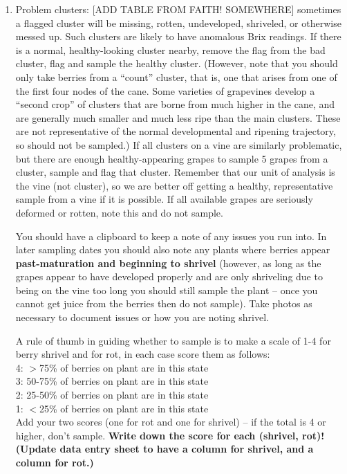 \documentclass[11pt,letter]{article}
\begin{document}
\begin{enumerate}
\item Problem clusters: [ADD TABLE FROM FAITH! SOMEWHERE] sometimes a flagged cluster will be missing, rotten, undeveloped, shriveled, or otherwise messed up. Such clusters are likely to have anomalous Brix readings. If there is a normal, healthy-looking cluster nearby, remove the flag from the bad cluster, flag and sample the healthy cluster. (However, note that you should only take berries from a “count” cluster, that is, one that arises from one of the first four nodes of the cane. Some varieties of grapevines develop a “second crop” of clusters that are borne from much higher in the cane, and are generally much smaller and much less ripe than the main clusters. These are not representative of the normal developmental and ripening trajectory, so should not be sampled.)  If all clusters on a vine are similarly problematic, but there are enough healthy-appearing grapes to sample 5 grapes from a cluster, sample and flag that cluster. Remember that our unit of analysis is the vine (not cluster), so we are better off getting a healthy, representative sample from a vine if it is possible. If all available grapes are seriously deformed or rotten, note this and do not sample. %

You should have a clipboard to keep a note of any issues you run into. In later sampling dates you should also note any plants where berries appear {\bf past-maturation and beginning to shrivel} (however, as long as the grapes appear to have developed properly and are only shriveling due to being on the vine too long you should still sample the plant -- once you cannot get juice from the berries then do not sample). Take photos as necessary to document issues or how you are noting shrivel.

A rule of thumb in guiding whether to sample is to make a scale of 1-4 for berry shrivel and for rot, in each case score them as follows: \\
4: $>$75\% of berries on plant are in this state \\
3: 50-75\% of berries on plant are in this state \\
2: 25-50\% of berries on plant are in this state \\
1: $<$25\% of berries on plant are in this state \\
Add your two scores (one for rot and one for shrivel) -- if the total is 4 or higher, don't sample. {\bf Write down the score for each (shrivel, rot)! (Update data entry sheet to have a column for shrivel, and a column for rot.)}


\end{enumerate}
\end{document}
